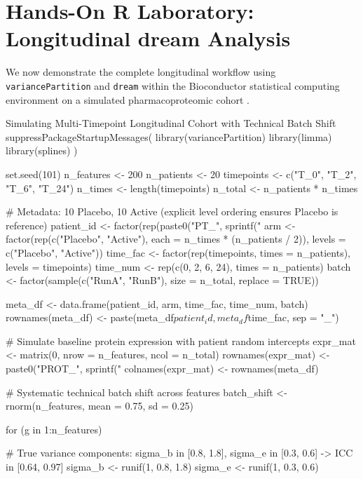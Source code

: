 \documentclass[11pt,twoside,openright]{book}
\begin{document}
\section{Hands-On R Laboratory: Longitudinal dream Analysis}

We now demonstrate the complete longitudinal workflow using \texttt{variancePartition} and \texttt{dream} within the Bioconductor statistical computing environment \cite{gentleman2005bioinformatics} on a simulated pharmacoproteomic cohort \cite{hoffman2021dream, choi2014msstats, goeminne2016msqrob2}.

\begin{rchunk}{Simulating Multi-Timepoint Longitudinal Cohort with Technical Batch Shift}
suppressPackageStartupMessages({
  library(variancePartition)
  library(limma)
  library(splines)
})

set.seed(101)
n_features <- 200
n_patients <- 20
timepoints <- c("T_0", "T_2", "T_6", "T_24")
n_times    <- length(timepoints)
n_total    <- n_patients * n_times

# Metadata: 10 Placebo, 10 Active (explicit level ordering ensures Placebo is reference)
patient_id <- factor(rep(paste0("PT_", sprintf("%
arm        <- factor(rep(c("Placebo", "Active"), each = n_times * (n_patients / 2)),
                     levels = c("Placebo", "Active"))
time_fac   <- factor(rep(timepoints, times = n_patients), levels = timepoints)
time_num   <- rep(c(0, 2, 6, 24), times = n_patients)
batch      <- factor(sample(c("RunA", "RunB"), size = n_total, replace = TRUE))

meta_df <- data.frame(patient_id, arm, time_fac, time_num, batch)
rownames(meta_df) <- paste(meta_df$patient_id, meta_df$time_fac, sep = "_")

# Simulate baseline protein expression with patient random intercepts
expr_mat <- matrix(0, nrow = n_features, ncol = n_total)
rownames(expr_mat) <- paste0("PROT_", sprintf("%
colnames(expr_mat) <- rownames(meta_df)

# Systematic technical batch shift across features
batch_shift <- rnorm(n_features, mean = 0.75, sd = 0.25)

for (g in 1:n_features) {
  # True variance components: sigma_b in [0.8, 1.8], sigma_e in [0.3, 0.6] -> ICC in [0.64, 0.97]
  sigma_b <- runif(1, 0.8, 1.8)
  sigma_e <- runif(1, 0.3, 0.6)
  
}
\end{rchunk}
\end{document}
